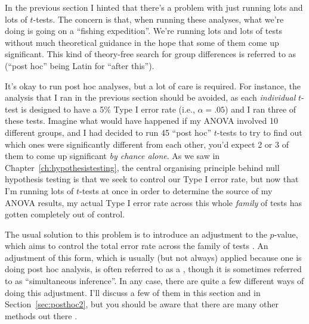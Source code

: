 
In the previous section I hinted that there's a problem with just running lots and lots of $t$-tests. The concern is that, when running these analyses, what we're doing is going on a ``fishing expedition''. We're running lots and lots of tests without much theoretical guidance in the hope that some of them come up significant. This kind of theory-free search for group differences is referred to as  (``post hoc'' being Latin for ``after this'').   

It's okay to run post hoc analyses, but a lot of care is required. For instance, the analysis that I ran in the previous section should be avoided, as each {\it individual} $t$-test is designed to have a 5\% Type I error rate (i.e., $\alpha = .05$) and I ran three of these tests. Imagine what would have happened if my ANOVA involved 10 different groups, and I had decided to run 45 ``post hoc'' $t$-tests to try to find out which ones were significantly different from each other, you'd expect 2 or 3 of them to come up significant {\it by chance alone}. As we saw in Chapter~\ref{ch:hypothesistesting}, the central organising principle behind null hypothesis testing is that we seek to control our Type I error rate, but now that I'm running lots of $t$-tests at once in order to determine the source of my ANOVA results, my actual Type I error rate across this whole {\it family} of tests has gotten completely out of control. 

The usual solution to this problem is to introduce an adjustment to the $p$-value, which aims to control the total error rate across the family of tests \parencite[see][]{Shaffer1995}. An adjustment of this form, which is usually (but not always) applied because one is doing post hoc analysis, is often referred to as a , though it is sometimes referred to as ``simultaneous inference''. In any case, there are quite a few different ways of doing this adjustment. I'll discuss a few of them in this section and in Section~\ref{sec:posthoc2}, but you should be aware that there are many other methods out there \parencite[see, e.g.,][]{Hsu1996}. 

